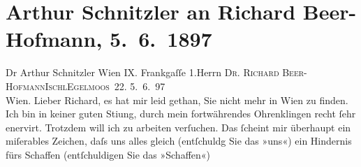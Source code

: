

         
         \newcommand{\erwaehntePersonen}{Personen: Richard Beer-Hofmann, Paula Beer-Hofmann, Georg Hirschfeld, Leopold Petter, Louise Schnitzler}
         \newcommand{\erwaehnteInstitutionen}{}
         \newcommand{\erwaehnteOrte}{Orte: Bad Ischl, Eglmoosgasse, Frankgasse, Hotel und Pension Rudolfshöhe (Leopold Petter), I., Innere Stadt, Wien}
         \newcommand{\erwaehnteWerke}{Werke: Agnes Jordan. Schauspiel in fünf Akten}
               \section[Arthur Schnitzler an Richard Beer-Hofmann, 5. 6. 1897]{ Arthur Schnitzler an Richard Beer-Hofmann, 5. 6. 1897}\nopagebreak{}\rehead{ }\begin{ledgroupsized}[t]{13cm}\normalsize\beginnumbering \toendnotes[C]{\smallbreak\pagebreak[2]} 
\toendnotes[C]{\smallbreak}\pstart{}{\pb}Dr Arthur Schnitzler Wien IX. Frankgaſſe 1.\pend{}{\bigskip}\pstart{}{\pb}Herrn \textsc{Dr. Richard
                     Beer-Hofmann}\pend{}\pstart{}\textsc{Ischl}\pend{}\pstart{}\textsc{Egelmoos 22}.\pend{}{\bigskip}\pstart
           \raggedleft{}{\pb}5. 6. 97{\\}Wien. \pend
           \pstart
           Lieber Richard, es hat mir leid gethan, Sie nicht mehr in Wien zu finden. Ich bin in keiner guten Sti{\geminationm}ung, durch mein fortwährendes Ohrenklingen recht ſehr
               enervirt. Trotzdem will ich zu arbeiten verſuchen. Das ſcheint mir überhaupt ein
               miſerables Zeichen, daſs uns alles gleich (entſchuldg Sie das »uns«) ein Hindernis
               fürs {\pb}Schaffen (entſchuldigen Sie das »Schaffen«)

\end{ledgroupsized}
